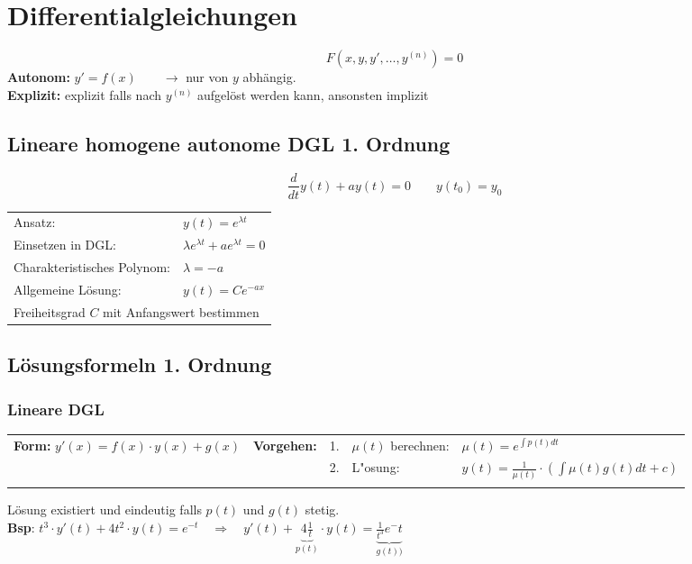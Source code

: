 \section{Differentialgleichungen}
\[ F(x,y,y',\dots,y^{(n)}) = 0 \]
\textbf{Autonom:} $y' = f(x) \qquad \rightarrow$ nur von $y$ abhängig.\\
\textbf{Explizit:} explizit falls nach $y^{(n)}$ aufgelöst werden kann, ansonsten implizit

\subsection{Lineare homogene autonome DGL 1. Ordnung}

\[ \dfrac{d}{dt}y(t)+ay(t)=0 \qquad y(t_0)=y_0 \]
\begin{tabular}{ll}
Ansatz: & $y(t) = e^{\lambda t}$\\
Einsetzen in DGL: & $\lambda e^{\lambda t} + ae^{\lambda t} = 0$\\
Charakteristisches Polynom: & $\lambda = -a$\\
Allgemeine Lösung: & $y(t) = Ce^{-ax}$\\
\multicolumn{2}{l}{Freiheitsgrad $C$ mit Anfangswert bestimmen} \\
\end{tabular}

\subsection{Lösungsformeln 1. Ordnung}
\subsubsection{Lineare DGL}
\begin{tabular}{p{6cm}p{2cm}p{0.2cm}p{3.8cm}p{6.5cm}}
\textbf{Form:} \quad $y'(x) = f(x) \cdot y(x) + g(x)$ &
\textbf{Vorgehen:} &
1. & $\mu(t)$ berechnen: & $\mu(t) = e^{\int p(t) dt}$ \\ &&
2. & L"osung: & $y(t) = \frac{1}{\mu(t)} \cdot ( \int \mu(t) g(t) dt +c)$ \\ &&
\end{tabular}
Lösung existiert und eindeutig falls $p(t)$ und $g(t)$ stetig.\\
\textbf{Bsp}: $t^3 \cdot y'(t) + 4 t^2 \cdot y(t) = e^{-t} \quad \Longrightarrow \quad y'(t) + \underbrace{4 \frac{1}{t}}_{p(t)} \cdot y(t) = \underbrace{\frac{1}{t^3} e^-t}_{g(t))}$


